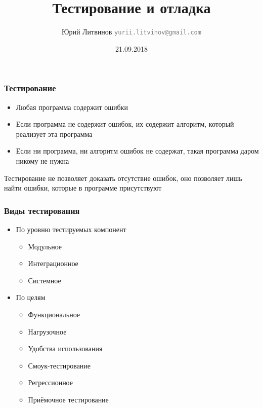 \documentclass[xetex,mathserif,serif]{beamer}
\title{Тестирование и отладка}
\author[Юрий Литвинов]{Юрий Литвинов \newline \textcolor{gray}{\small\texttt{yurii.litvinov@gmail.com}}}
\date{21.09.2018}
\begin{document}
	
	\frame{\titlepage}
	
	\begin{frame}
		\frametitle{Тестирование}
		\begin{itemize}
			\item Любая программа содержит ошибки                                                    
			\item Если программа не содержит ошибок, их содержит алгоритм, который реализует эта программа
			\item Если ни программа, ни алгоритм ошибок не содержат, такая программа даром никому не нужна
		\end{itemize}
		\vspace{1cm}
		Тестирование не позволяет доказать отсутствие ошибок, оно позволяет лишь найти ошибки, которые в программе присутствуют
	\end{frame}

	\begin{frame}
		\frametitle{Виды тестирования}
		\begin{itemize}
			\item По уровню тестируемых компонент
			\begin{itemize}
				\item Модульное
				\item Интеграционное
				\item Системное
			\end{itemize}
			\item По целям
			\begin{itemize}
				\item Функциональное
				\item Нагрузочное
				\item Удобства использования
				\item Смоук-тестирование
				\item Регрессионное
				\item Приёмочное тестирование
			\end{itemize}
		\end{itemize}
	\end{frame}
                
\end{document}
